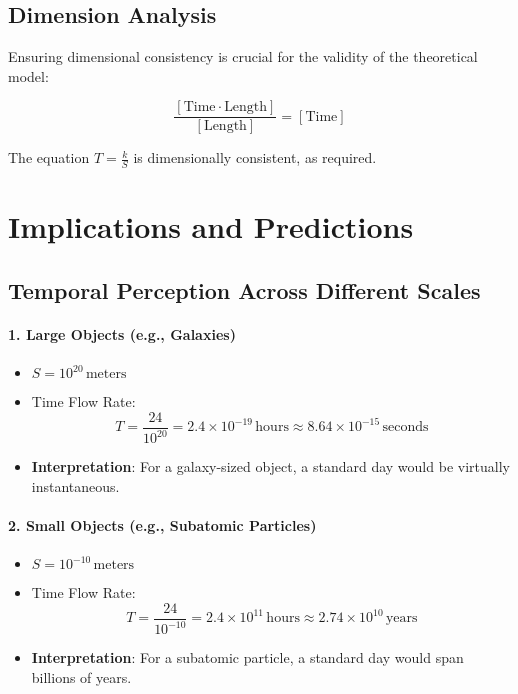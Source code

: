 \documentclass[12pt]{article}
\begin{document}
\subsection{Dimension Analysis}

Ensuring dimensional consistency is crucial for the validity of the theoretical model:

\[
\frac{[\text{Time} \cdot \text{Length}]}{[\text{Length}]} = [\text{Time}]
\]

The equation \( T = \frac{k}{S} \) is dimensionally consistent, as required.

\section{Implications and Predictions}

\subsection{Temporal Perception Across Different Scales}

\paragraph{1. Large Objects (e.g., Galaxies)}
\begin{itemize}
    \item \( S = 10^{20} \, \text{meters} \)
    \item Time Flow Rate:
\[
T = \frac{24}{10^{20}} = 2.4 \times 10^{-19} \, \text{hours} \approx 8.64 \times 10^{-15} \, \text{seconds}
\]
    \item \textbf{Interpretation}: For a galaxy-sized object, a standard day would be virtually instantaneous.
\end{itemize}

\paragraph{2. Small Objects (e.g., Subatomic Particles)}
\begin{itemize}
    \item \( S = 10^{-10} \, \text{meters} \)
    \item Time Flow Rate:
\[
T = \frac{24}{10^{-10}} = 2.4 \times 10^{11} \, \text{hours} \approx 2.74 \times 10^{10} \, \text{years}
\]
    \item \textbf{Interpretation}: For a subatomic particle, a standard day would span billions of years.
\end{itemize}
\end{document}
